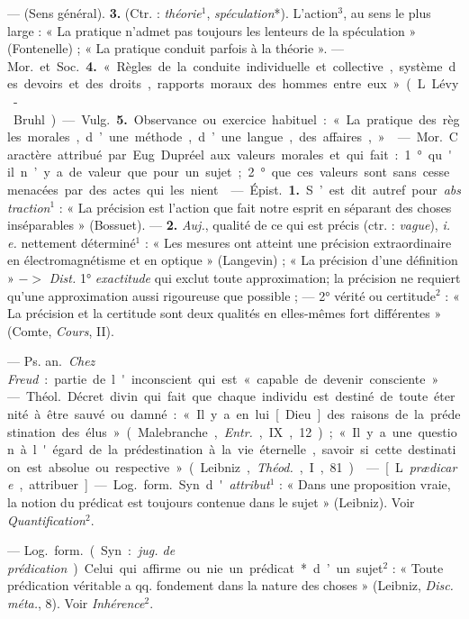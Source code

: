 \begin{itemize}[leftmargin=1cm, label=, itemsep=1pt]
 — (Sens général).  {\bf 3.} (Ctr. : {\it théorie}$^1$,
{\it spéculation}*). L'action$^3$, au sens le plus large : « La pratique
n’admet pas toujours les lenteurs de la spéculation » (Fontenelle) ; « La
pratique conduit parfois à la théorie ». — \si{Mor.} et \si{Soc.} {\bf 4.} «
Règles de la conduite individuelle et collective, système des devoirs et des
droits, rapports moraux des hommes entre eux » (L. Lévy-Bruhl). —
\si{Vulg.} {\bf 5.} Observance ou exercice habituel : « La pratique des
règles morales, d’une méthode, d’une langue, des affaires, »

 — \si{Mor.} Caractère attribué par Eug. Dupréel aux valeurs
morales et qui fait : 1° qu'il n’y a de valeur que pour un sujet ; 2° que ces
valeurs sont sans cesse menacées par des actes qui les nient.

 — \si{Épist.} {\bf 1.} S’est dit autref. pour
{\it abstraction}$^1$ : « La précision est l’action que fait notre
esprit en séparant des choses inséparables » (Bossuet). — {\bf 2.}
{\it Auj.}, qualité de ce qui est précis (ctr. : {\it vague}),
{\it i. e.} nettement déterminé$^1$ : « Les mesures ont atteint une précision
extraordinaire en électromagnétisme et en optique » (Langevin) ; « La
précision d'une définition » $->$ {\it Dist.} 1° {\it exactitude} qui exclut
toute approximation; la précision ne requiert qu’une approximation aussi
rigoureuse que possible ; — 2° vérité ou certitude$^2$ : « La  précision et la
certitude sont deux qualités en elles-mêmes fort différentes » (Comte,
{\it Cours}, II).

 — \si{Ps. an.} {\it Chez Freud} : partie de l'inconscient
qui est « capable de devenir consciente ».

 — \si{Théol.} Décret divin qui fait que chaque individu
est destiné de toute éternité à être
sauvé ou damné : « Il y a en lui [Dieu] des raisons de la prédestination des
élus » (Malebranche, {\it Entr.}, IX, 12) ; « Il y a une question à l'égard
de la prédestination à la vie éternelle, savoir si cette destination est
absolue ou respective » (Leibniz, {\it Théod.}, I, 81).

 — [L. {\it prædicare}, attribuer] — \si{Log.} \si{form.} Syn.
d'{\it attribut}$^1$ : « Dans une proposition vraie, la notion du prédicat
est toujours contenue dans le sujet » (Leibniz). Voir
{\it Quantification}$^2$.

 — \si{Log.} \si{form.} (Syn. : {\it jug. de
prédication}). Celui qui affirme ou nie un prédicat* d’un sujet$^2$ : « Toute
prédication véritable a qq. fondement dans la nature des choses » (Leibniz,
{\it Disc. méta.}, 8). Voir {\it Inhérence}$^2$.


\end{itemize}
